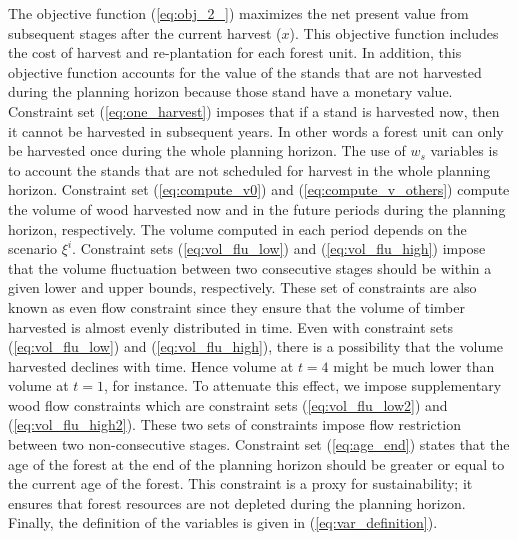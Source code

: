 \documentclass[forests,article,submit,moreauthors,pdftex]{Definitions/mdpi}
\begin{document}
The objective function (\ref{eq:obj_2_})  maximizes the net present value from subsequent stages after the current harvest ($x$). This objective function includes the cost of harvest and re-plantation for each forest unit. In addition, this objective function accounts for the value of the stands that are not harvested during the planning horizon because those stand have a monetary value. Constraint set (\ref{eq:one_harvest}) imposes that if a stand is harvested now, then it cannot be harvested in subsequent years. In other words a forest unit can only be harvested once during the whole planning horizon. The use of $w_s$ variables is to account the stands that are not scheduled for harvest in the whole planning horizon.
Constraint set (\ref{eq:compute_v0}) and (\ref{eq:compute_v_others})  compute the volume of wood harvested  now and in the future periods during the planning horizon, respectively. The volume computed in each period depends on the scenario $\xi^i$.
Constraint sets  (\ref{eq:vol_flu_low}) and  (\ref{eq:vol_flu_high}) impose that the volume fluctuation between two consecutive stages should be within a given lower and upper bounds, respectively. These set of constraints are also known as even flow constraint since they ensure that the volume of timber harvested is almost evenly distributed in time. Even with constraint sets  (\ref{eq:vol_flu_low}) and  (\ref{eq:vol_flu_high}), there is a possibility that the volume harvested declines with time. Hence volume at $t=4$ might be much lower than volume at $t=1$, for instance. To attenuate this effect, we impose supplementary wood flow constraints which are constraint sets (\ref{eq:vol_flu_low2}) and  (\ref{eq:vol_flu_high2}). These two sets of constraints impose flow restriction between two non-consecutive stages.
Constraint set (\ref{eq:age_end}) states that the age of the forest at the end of the planning horizon should be greater or equal to the current age of the forest. 
This constraint is a proxy for sustainability; it ensures that forest resources are not depleted during the planning horizon.  Finally, the definition of the variables is given in (\ref{eq:var_definition}).

\end{document}
